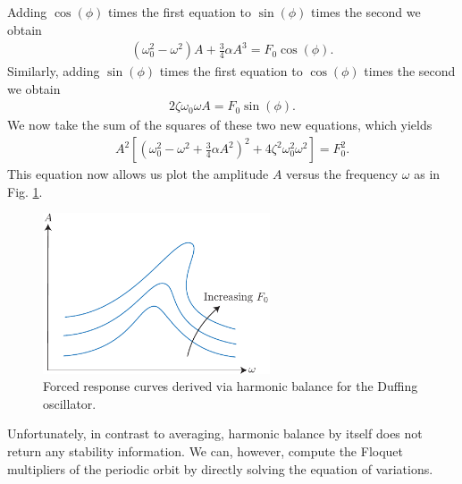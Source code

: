 Adding $\cos(\phi)$ times the first equation to $\sin(\phi)$ times the second we obtain
\begin{align}
	\left( \omega _0^2 - \omega^2 \right) A + \frac{3}{4} \alpha A^3 = F_0 \cos (\phi).
\end{align}
Similarly, adding $\sin(\phi)$ times the first equation to $\cos(\phi)$ times the second we obtain
\begin{align}
	2 \zeta \omega_0 \omega A = F_0 \sin (\phi).
\end{align}
We now take the sum of the squares of these two new equations, which yields
\begin{align}
	A^2 \left[ \left( \omega _0^2 - \omega ^2 + \frac{3}{4} \alpha A^2 \right) ^2 + 4 \zeta^2 \omega_0^2 \omega ^2 \right] = F_0^2.
\end{align}
This equation now allows us plot the amplitude $A$ versus the frequency $\omega$ as in Fig. \ref{fig:forced_response2}.
\begin{figure}[h!]
	\centering
	\includegraphics[width=0.6\textwidth]{figures/ch5/12forced_responce2.pdf}
	\caption{Forced response curves derived via harmonic balance for the Duffing oscillator.}
	\label{fig:forced_response2}
\end{figure}

Unfortunately, in contrast to averaging, harmonic balance by itself does not return any stability information. We can, however, compute the Floquet multipliers of the periodic orbit by directly solving the equation of variations. 

